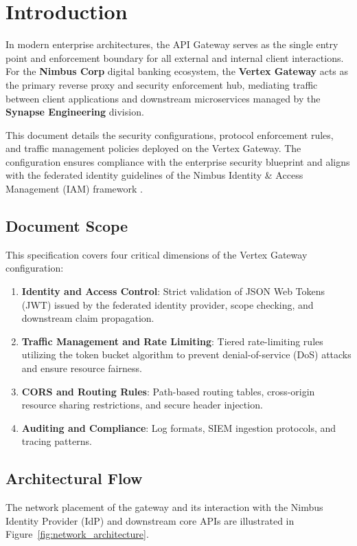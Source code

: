 \section{Introduction}
\label{sec:introduction}

In modern enterprise architectures, the API Gateway serves as the single entry point and enforcement boundary for all external and internal client interactions. For the \textbf{Nimbus Corp} digital banking ecosystem, the \textbf{Vertex Gateway} acts as the primary reverse proxy and security enforcement hub, mediating traffic between client applications and downstream microservices managed by the \textbf{Synapse Engineering} division.

This document details the security configurations, protocol enforcement rules, and traffic management policies deployed on the Vertex Gateway. The configuration ensures compliance with the enterprise security blueprint \cite{vertex_arch} and aligns with the federated identity guidelines of the Nimbus Identity \& Access Management (IAM) framework \cite{nimbus_auth_spec}.

\subsection{Document Scope}
This specification covers four critical dimensions of the Vertex Gateway configuration:
\begin{enumerate}
    \item \textbf{Identity and Access Control}: Strict validation of JSON Web Tokens (JWT) issued by the federated identity provider, scope checking, and downstream claim propagation.
    \item \textbf{Traffic Management and Rate Limiting}: Tiered rate-limiting rules utilizing the token bucket algorithm to prevent denial-of-service (DoS) attacks and ensure resource fairness.
    \item \textbf{CORS and Routing Rules}: Path-based routing tables, cross-origin resource sharing restrictions, and secure header injection.
    \item \textbf{Auditing and Compliance}: Log formats, SIEM ingestion protocols, and tracing patterns.
\end{enumerate}

\subsection{Architectural Flow}
The network placement of the gateway and its interaction with the Nimbus Identity Provider (IdP) and downstream core APIs are illustrated in Figure~\ref{fig:network_architecture}.

